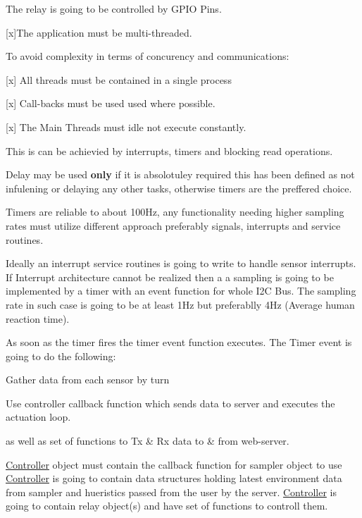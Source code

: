 The relay is going to be controlled by G\+P\+IO Pins.


\begin{DoxyEnumerate}
\item \mbox{[}x\mbox{]}The application must be multi-\/threaded.
\item To avoid complexity in terms of concurency and communications\+:
\begin{DoxyEnumerate}
\item \mbox{[}x\mbox{]} All threads must be contained in a single process
\item \mbox{[}x\mbox{]} Call-\/backs must be used used where possible.
\item \mbox{[}x\mbox{]} The Main Threads must idle not execute constantly.
\end{DoxyEnumerate}
\end{DoxyEnumerate}

This is can be achievied by interrupts, timers and blocking read operations.

Delay may be used {\bfseries only} if it is absolotuley required this has been defined as not infulening or delaying any other tasks, otherwise timers are the preffered choice.

Timers are reliable to about 100\+Hz, any functionality needing higher sampling rates must utilize different approach preferably signals, interrupts and service routines.

Ideally an interrupt service routines is going to write to handle sensor interrupts. If Interrupt architecture cannot be realized then a a sampling is going to be implemented by a timer with an event function for whole I2C Bus. The sampling rate in such case is going to be at least 1\+Hz but preferablly 4\+Hz (Average human reaction time).

As soon as the timer fires the timer event function executes. The Timer event is going to do the following\+:
\begin{DoxyEnumerate}
\item Gather data from each sensor by turn
\item Use controller callback function which sends data to server and executes the actuation loop.
\end{DoxyEnumerate}

as well as set of functions to Tx \& Rx data to \& from web-\/server.

\hyperlink{classController}{Controller} object must contain the callback function for sampler object to use \hyperlink{classController}{Controller} is going to contain data structures holding latest environment data from sampler and hueristics passed from the user by the server. \hyperlink{classController}{Controller} is going to contain relay object(s) and have set of functions to controll them.

